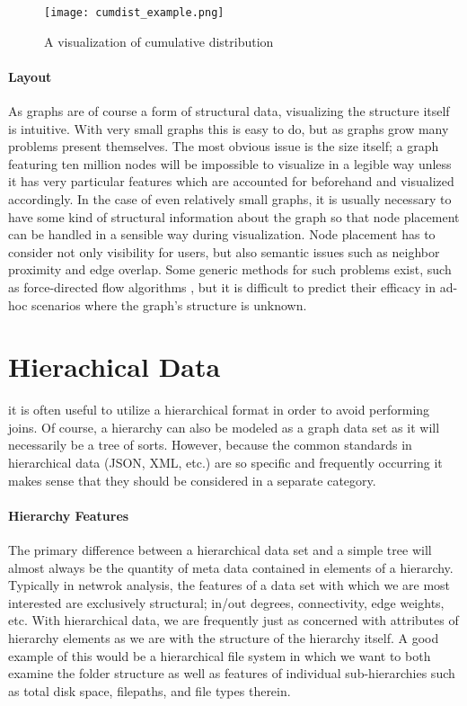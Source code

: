 \begin{figure}
	\centering
	\texttt{[image: cumdist\_example.png]}
	\caption{A visualization of cumulative distribution \citep{KONECT}}
	\label{fig:cumdist}
\end{figure}

\paragraph{Layout}
As graphs are of course a form of structural data, visualizing the structure itself is intuitive. With very small graphs this is easy to do, but as graphs grow many problems present themselves. The most obvious issue is the size itself; a graph featuring ten million nodes will be impossible to visualize in a legible way unless it has very particular features which are accounted for beforehand and visualized accordingly. In the case of even relatively small graphs, it is usually necessary to have some kind of structural information about the graph so that node placement can be handled in a sensible way during visualization. Node placement has to consider not only visibility for users, but also semantic issues such as neighbor proximity and edge overlap. Some generic methods for such problems exist, such as force-directed flow algorithms \citep{Didimo2011}, but it is difficult to predict their efficacy in ad-hoc scenarios where the graph's structure is unknown.
 

\section{Hierachical Data}
\label{sec:hierarchical}
 it is often useful to utilize a hierarchical format in order to avoid performing joins. Of course, a hierarchy can also be modeled as a graph data set as it will necessarily be a tree of sorts. However, because the common standards in hierarchical data (JSON, XML, etc.) are so specific and frequently occurring it makes sense that they should be considered in a separate category.

\paragraph{Hierarchy Features}
The primary difference between a hierarchical data set and a simple tree will almost always be the quantity of meta data contained in elements of a hierarchy. Typically in netwrok analysis, the features of a data set with which we are most interested are exclusively structural; in/out degrees, connectivity, edge weights, etc. With hierarchical data, we are frequently just as concerned with attributes of hierarchy elements as we are with the structure of the hierarchy itself. A good example of this would be a hierarchical file system in which we want to both examine the folder structure as well as features of individual sub-hierarchies such as total disk space, filepaths, and file types therein. 

